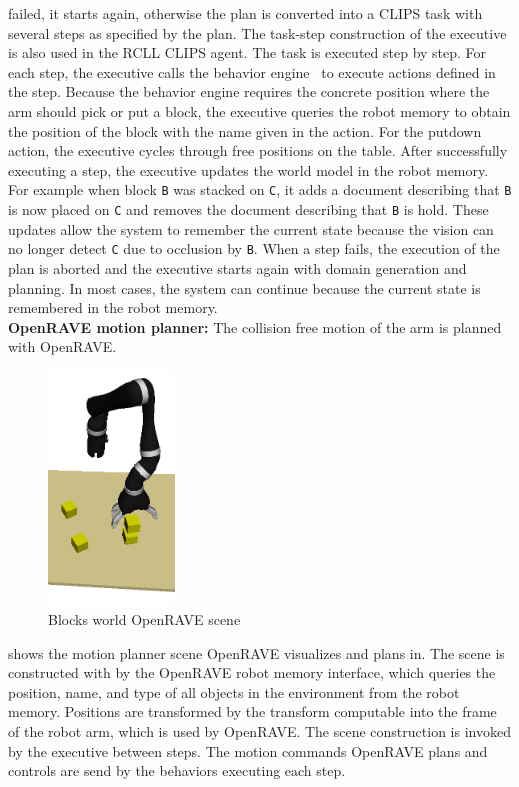 failed, it starts again, otherwise the plan is converted into a CLIPS
task with several steps as specified by the plan. The task-step
construction of the executive is also used in the RCLL CLIPS
agent. The task is executed step by step. For each step, the executive
calls the behavior engine~\cite{Behavior-Engine} to execute actions
defined in the step. Because the behavior engine requires the concrete
position where the arm should pick or put a block, the executive
queries the robot memory to obtain the position of the block with the
name given in the action. For the putdown action, the executive cycles
through free positions on the table. After successfully executing a
step, the executive updates the world model in the robot memory. For
example when block \texttt{B} was stacked on \texttt{C}, it adds a
document describing that \texttt{B} is now placed on \texttt{C} and
removes the document describing that \texttt{B} is hold. These updates
allow the system to remember the current state because the vision can
no longer detect \texttt{C} due to occlusion by \texttt{B}. When a
step fails, the execution of the plan is aborted and the executive
starts again with domain generation and planning. In most cases, the
system can continue because the current state is remembered in the
robot memory.
\\
\textbf{OpenRAVE motion planner:} The collision free motion of the arm
is planned with OpenRAVE.
\begin{figure}
  \centering
  \includegraphics[width=0.3\textwidth]{img/openrave-scene}%
  \caption[Blocks world OpenRAVE scene]{Blocks world OpenRAVE scene}
  \vspace{-4mm}
  \label{fig:openrave}
\end{figure}
 shows the motion planner scene OpenRAVE
visualizes and plans in. The scene is constructed with by the OpenRAVE
robot memory interface, which queries the position, name, and type of
all objects in the environment from the robot memory. Positions are
transformed by the transform computable into the frame of the robot
arm, which is used by OpenRAVE. The scene construction is invoked by
the executive between steps. The motion commands OpenRAVE plans and
controls are send by the behaviors executing each step.
